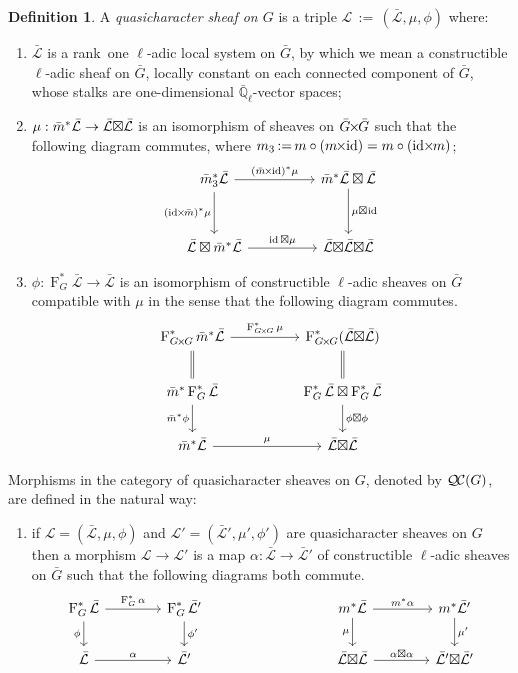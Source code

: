 \documentclass{amsart}
\makeatletter
\theoremstyle{plain}
\theoremstyle{definition}
\newtheorem{definition}[theorem]{Definition}
\theoremstyle{remark}
\newcommand{\EE}{\mathbb{\bar Q}_\ell}
\newcommand{\Frob}[1]{\operatorname{F}_{#1}}
\DeclareMathOperator{\id}{id}
\newcommand{\ceq}{{\, :=\, }}
\newcommand{\qcs}[1]{{\mathcal{#1}}}
\newcommand{\gqcs}[1]{{\mathcal{\bar #1}}}
\newcommand{\QC}{{\mathcal{Q\hskip-0.8pt C}}}
\newcommand{\labitem}[2]{
\def\@itemlabel{\textbf{#1}}
\item
\def\@currentlabel{#1}\label{#2}}
\newcommand{\bm}{\bar{m}}
\newcommand{\bG}{\bar{G}}
\newcommand{\tight}[3]{\hspace{-#1pt}{#2}\hspace{-#3pt}}
\newcommand{\bGxG}{\text{$\bar{G} \tight{1}{\times}{1} \bar{G}$}}
\newcommand{\GxxG}{\text{$G \tight{1}{\times}{1} G$}}
\newcommand{\LxL}{\text{$\gqcs{L} \tight{0}{\boxtimes}{0} \gqcs{L}$}}
\makeatother
\begin{document}
\begin{definition}\label{def:QC}
A \emph{quasicharacter sheaf on $G$} is a triple
$\qcs{L}\ceq (\gqcs{L},\mu,\phi)$ where:
\begin{enumerate}
\labitem{(QC.1)}{QC.1} $\gqcs{L}$ is a rank~one $\ell$-adic local system on $\bG$, by which we mean
a constructible $\ell$-adic sheaf on $\bG$, locally constant on each connected
component of $\bG$, whose stalks are one-dimensional $\EE$-vector spaces;
\labitem{(QC.2)}{QC.2} $\mu: \bm^* \gqcs{L} \to \LxL$ is an isomorphism of
sheaves on $\bGxG$ such that the following diagram commutes,
  where $m_3 \ceq m\circ (m\tight{1}{\times}{2}\id) = m\circ (\id\tight{2}{\times}{1} m)$;
  \[
  \begin{tikzcd}[row sep=30]
  \bm_3^*\gqcs{L} \arrow{rr}{(\bm \tight{1}{\times}{2} \id)^*\mu} \arrow[swap]{d}{(\id \tight{2}{\times}{1} \bm)^*\mu}
    &&  \bm^*\gqcs{L} \boxtimes \gqcs{L} \dar{\mu \tight{0}{\boxtimes}{1} \id} \\
    \gqcs{L} \boxtimes \bm^* \gqcs{L} \arrow{rr}{\id \boxtimes \mu}
    &&  \gqcs{L} \tight{0}{\boxtimes}{0} \LxL
  \end{tikzcd}
  \]
\labitem{(QC.3)}{QC.3} $\phi : \Frob{G}^* \gqcs{L} \to \gqcs{L}$ is an
  isomorphism of constructible $\ell$-adic sheaves on $\bG$ compatible with
  $\mu$ in the sense that the following diagram commutes.
  \[
  \begin{tikzcd}[row sep=20]
  \Frob{\GxxG}^* \bm^* \gqcs{L} \arrow{rr}{\Frob{\GxxG}^*\mu}
    && \Frob{\GxxG}^*(\LxL)\\
    \arrow[equal]{u} \bm^*  \Frob{G}^* \gqcs{L} \arrow[swap]{d}{\bm^* \phi}
    && \Frob{G}^*\gqcs{L}\boxtimes \Frob{G}^*\gqcs{L} \dar{\phi\boxtimes \phi} \arrow[equal]{u} \\
    \bm^*\gqcs{L} \arrow{rr}{\mu}
    && \LxL
  \end{tikzcd}
  \]
\end{enumerate}
\end{definition}

Morphisms in the category of quasicharacter sheaves on $G$, denoted by $\QC(G)$, are defined in the natural way:
\begin{enumerate}
\labitem{(QC.4)}{QC.4} if $\qcs{L} = (\gqcs{L},\mu,\phi)$ and
  $\qcs{L'} = (\gqcs{L'},\mu',\phi')$ are quasicharacter sheaves on $G$ then
  a morphism $\qcs{L} \to \qcs{L}'$ is a map $\alpha : \gqcs{L} \to \gqcs{L'}$
  of constructible $\ell$-adic sheaves on $\bG$ such that the following diagrams both commute.
  \[
  \begin{tikzcd}[column sep=40]
  \Frob{G}^* \gqcs{L} \rar{\Frob{G}^* \alpha} \arrow[swap]{d}{\phi} & \Frob{G}^* \gqcs{L'} \dar{\phi'}
  & & \arrow[swap]{d}{\mu} m^* \gqcs{L} \rar{m^* \alpha} & m^* \gqcs{L'} \dar{\mu'} \\
  \gqcs{L} \rar{\alpha} & \gqcs{L'}
  & {} & \LxL \rar{\tight{1}{\alpha\boxtimes \alpha}{1}} & \gqcs{L'} \tight{0}{\boxtimes}{0} \gqcs{L'}
  \end{tikzcd}
  \]
\end{enumerate}
\end{document}
